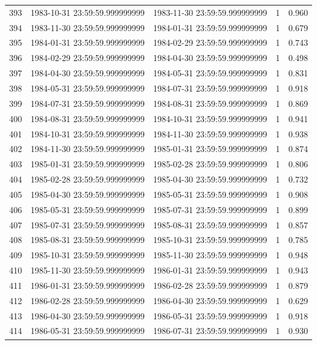 \begin{table}
\begin{tabular}{lcccc}
393 & 1983-10-31 23:59:59.999999999 & 1983-11-30 23:59:59.999999999 & 1 & 0.960 \\
394 & 1983-11-30 23:59:59.999999999 & 1984-01-31 23:59:59.999999999 & 1 & 0.679 \\
395 & 1984-01-31 23:59:59.999999999 & 1984-02-29 23:59:59.999999999 & 1 & 0.743 \\
396 & 1984-02-29 23:59:59.999999999 & 1984-04-30 23:59:59.999999999 & 1 & 0.498 \\
397 & 1984-04-30 23:59:59.999999999 & 1984-05-31 23:59:59.999999999 & 1 & 0.831 \\
398 & 1984-05-31 23:59:59.999999999 & 1984-07-31 23:59:59.999999999 & 1 & 0.918 \\
399 & 1984-07-31 23:59:59.999999999 & 1984-08-31 23:59:59.999999999 & 1 & 0.869 \\
400 & 1984-08-31 23:59:59.999999999 & 1984-10-31 23:59:59.999999999 & 1 & 0.941 \\
401 & 1984-10-31 23:59:59.999999999 & 1984-11-30 23:59:59.999999999 & 1 & 0.938 \\
402 & 1984-11-30 23:59:59.999999999 & 1985-01-31 23:59:59.999999999 & 1 & 0.874 \\
403 & 1985-01-31 23:59:59.999999999 & 1985-02-28 23:59:59.999999999 & 1 & 0.806 \\
404 & 1985-02-28 23:59:59.999999999 & 1985-04-30 23:59:59.999999999 & 1 & 0.732 \\
405 & 1985-04-30 23:59:59.999999999 & 1985-05-31 23:59:59.999999999 & 1 & 0.908 \\
406 & 1985-05-31 23:59:59.999999999 & 1985-07-31 23:59:59.999999999 & 1 & 0.899 \\
407 & 1985-07-31 23:59:59.999999999 & 1985-08-31 23:59:59.999999999 & 1 & 0.857 \\
408 & 1985-08-31 23:59:59.999999999 & 1985-10-31 23:59:59.999999999 & 1 & 0.785 \\
409 & 1985-10-31 23:59:59.999999999 & 1985-11-30 23:59:59.999999999 & 1 & 0.948 \\
410 & 1985-11-30 23:59:59.999999999 & 1986-01-31 23:59:59.999999999 & 1 & 0.943 \\
411 & 1986-01-31 23:59:59.999999999 & 1986-02-28 23:59:59.999999999 & 1 & 0.879 \\
412 & 1986-02-28 23:59:59.999999999 & 1986-04-30 23:59:59.999999999 & 1 & 0.629 \\
413 & 1986-04-30 23:59:59.999999999 & 1986-05-31 23:59:59.999999999 & 1 & 0.918 \\
414 & 1986-05-31 23:59:59.999999999 & 1986-07-31 23:59:59.999999999 & 1 & 0.930 \\

\end{tabular}
\end{table}
